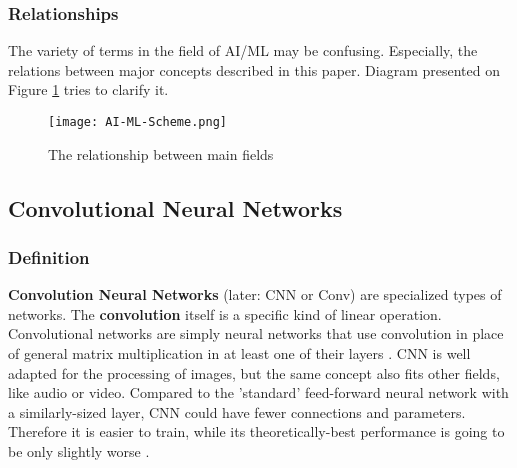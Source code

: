 \documentclass[../Main.tex]{subfiles}
\begin{document}
    \subsubsection{Relationships}
    The variety of terms in the field of AI/ML may be confusing. Especially, the relations between major concepts described in this paper. Diagram presented on Figure \ref{fig:AI-ML-Scheme} tries to clarify it.
    \begin{figure}[ht!]
        \centering
        \texttt{[image: AI-ML-Scheme.png]}
        \caption{The relationship between main fields}
        \label{fig:AI-ML-Scheme}
    \end{figure}

\subsection{Convolutional Neural Networks}

    \subsubsection{Definition}
    \textbf{Convolution Neural Networks} (later: CNN or Conv) are specialized types of networks. The \textbf{convolution} itself is a specific kind of linear operation. Convolutional networks are simply neural networks that use convolution in place of general matrix multiplication in at least one of their layers \cite{Goodfellow-et-al-2016}.  CNN is well adapted for the processing of images, but the same concept also fits other fields, like audio or video. 
    Compared to the 'standard' feed-forward neural network with a similarly-sized layer, CNN could have fewer connections and parameters. Therefore it is easier to train, while its theoretically-best performance is going to be only slightly worse \cite{krizhevsky-imagenet}.
        
\end{document}
